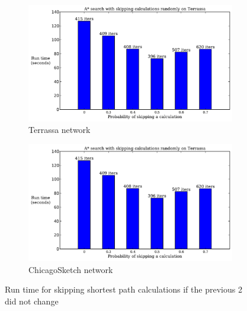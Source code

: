 \begin{figure}
    \centering
    \begin{subfigure}{.5\textwidth}
        \centering
        \includegraphics[page=3,width=\textwidth]{img/random_time}
        \caption{Terrassa network}
        \label{fig:terrassa_random_n}
    \end{subfigure}%
    \begin{subfigure}{.5\textwidth}
        \centering
        \includegraphics[page=4,width=\textwidth]{img/random_time}
        \caption{ChicagoSketch network}
        \label{fig:chicago_random_n}
    \end{subfigure}
    \caption{Run time for skipping shortest path calculations if the previous 2 did not change}
    \label{fig:random_n}
\end{figure}

